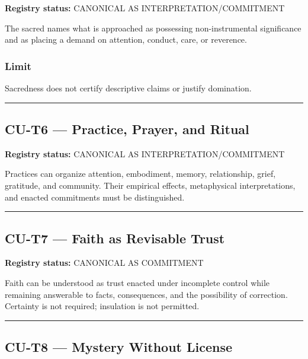 \documentclass[
  11pt,
]{article}
\begin{document}
\textbf{Registry status:} CANONICAL AS INTERPRETATION/COMMITMENT

The sacred names what is approached as possessing non-instrumental
significance and as placing a demand on attention, conduct, care, or
reverence.

\subsubsection{Limit}\label{limit-6}

Sacredness does not certify descriptive claims or justify domination.

\begin{center}\rule{0.5\linewidth}{0.5pt}\end{center}

\subsection{CU-T6 --- Practice, Prayer, and
Ritual}\label{cu-t6-practice-prayer-and-ritual}

\textbf{Registry status:} CANONICAL AS INTERPRETATION/COMMITMENT

Practices can organize attention, embodiment, memory, relationship,
grief, gratitude, and community. Their empirical effects, metaphysical
interpretations, and enacted commitments must be distinguished.

\begin{center}\rule{0.5\linewidth}{0.5pt}\end{center}

\subsection{CU-T7 --- Faith as Revisable
Trust}\label{cu-t7-faith-as-revisable-trust}

\textbf{Registry status:} CANONICAL AS COMMITMENT

Faith can be understood as trust enacted under incomplete control while
remaining answerable to facts, consequences, and the possibility of
correction. Certainty is not required; insulation is not permitted.

\begin{center}\rule{0.5\linewidth}{0.5pt}\end{center}

\subsection{CU-T8 --- Mystery Without
License}\label{cu-t8-mystery-without-license}
\end{document}
